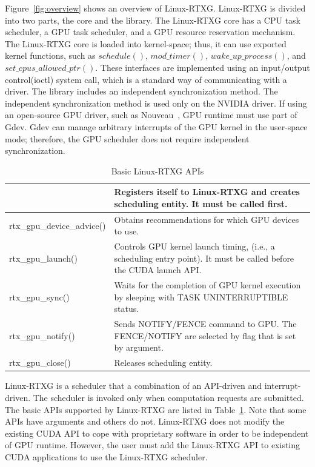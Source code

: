Figure~\ref{fig:overview} shows an overview of Linux-RTXG.
Linux-RTXG is divided into two parts, the core and the library.
The Linux-RTXG core has a CPU task scheduler, a GPU task scheduler, and a GPU resource reservation mechanism.
The Linux-RTXG core is loaded into kernel-space; thus, it can use exported kernel functions, such as $schedule()$, $mod\_timer()$, $wake\_up\_process()$, and $set\_cpus\_allowed\_ptr()$.
These interfaces are implemented using an input/output control(ioctl) system call, which is a standard way of communicating with a driver.
The library includes an independent synchronization method.
The independent synchronization method is used only on the NVIDIA driver.
If using an open-source GPU driver, such as Nouveau~\cite{nouveau}, GPU runtime must use part of Gdev.
Gdev can manage arbitrary interrupts of the GPU kernel in the user-space mode;
therefore, the GPU scheduler does not require independent synchronization.
\begin{table}[!t]
\begin{center}
\caption{Basic Linux-RTXG APIs}
\label{tab:rtx-api}
\ifthesis
\begin{tabular}{|l|p{25em}|} \hline
\else
\begin{tabular}{|l|p{50em}|} \hline
\fi
rtx\_gpu\_open() & Registers itself to Linux-RTXG and creates scheduling entity. It must be called first. \\ \hline
rtx\_gpu\_device\_advice() & Obtains recommendations for which GPU devices to use. \\ \hline
rtx\_gpu\_launch() & Controls GPU kernel launch timing, (i.e., a scheduling entry point). It must be called before the CUDA launch API. \\ \hline
rtx\_gpu\_sync() & Waits for the completion of GPU kernel execution by sleeping with TASK UNINTERRUPTIBLE status. \\ \hline
rtx\_gpu\_notify() & Sends NOTIFY/FENCE command to GPU. The FENCE/NOTIFY are selected by flag that is set by argument.\\ \hline
rtx\_gpu\_close() & Releases scheduling entity.\\ \hline
\end{tabular}
\end{center}
\end{table}

Linux-RTXG is a scheduler that a combination of an API-driven and interrupt-driven.
The scheduler is invoked only when computation requests are submitted.
The basic APIs supported by Linux-RTXG are listed in Table~\ref{tab:rtx-api}.
Note that some APIs have arguments and others do not.
Linux-RTXG does not modify the existing CUDA API to cope with proprietary software in order to be independent of GPU runtime.
However, the user must add the Linux-RTXG API to existing CUDA applications to use the Linux-RTXG scheduler.

